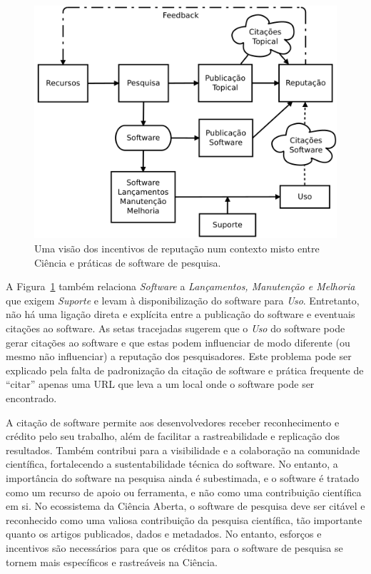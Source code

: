 \begin{figure}[tb]
  \center
  \includegraphics[scale=0.4]{figures/scientific-reputation-diagram.png}
  \caption{Uma visão dos incentivos de reputação num contexto misto entre Ciência e práticas de software de pesquisa.~\cite{howison2011scientific}}
  \label{fig:scientific-reputation-diagram}
\end{figure}

A Figura~\ref{fig:scientific-reputation-diagram} também relaciona  \textit{Software} a \textit{Lançamentos, Manutenção e Melhoria}
que exigem \textit{Suporte} e levam à disponibilização do software para \textit{Uso}.
Entretanto, não há uma ligação direta e explícita entre a publicação do software e eventuais citações ao software. As setas tracejadas sugerem que o \textit{Uso} do software pode gerar citações ao software e que estas podem influenciar de modo diferente (ou mesmo não influenciar) a reputação dos pesquisadores.
Este problema pode ser explicado pela falta de padronização da citação de software e prática frequente de ``citar'' apenas uma URL que leva a um local onde o software pode ser encontrado. 
  
A citação de software permite aos desenvolvedores receber reconhecimento e crédito pelo seu trabalho, além de facilitar a rastreabilidade e replicação dos resultados. Também contribui para a visibilidade e a colaboração na comunidade científica, fortalecendo a sustentabilidade técnica do software. No entanto, a importância do software na pesquisa ainda é subestimada, e o software é tratado como um recurso de apoio ou ferramenta, e não como uma contribuição científica em si. 
%
No ecossistema da Ciência Aberta, o software de pesquisa deve ser citável e reconhecido como uma valiosa contribuição da pesquisa científica, tão importante quanto os artigos publicados, dados e metadados.  No entanto, esforços e incentivos são necessários para que os créditos para o software de pesquisa se tornem mais específicos e rastreáveis na Ciência.

